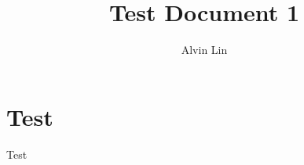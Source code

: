 \documentclass[letterpaper, 12pt]{article}
\title{Test Document 1}
\author{Alvin Lin}
\begin{document}
\maketitle

\section*{Test}
Test
\end{document}

